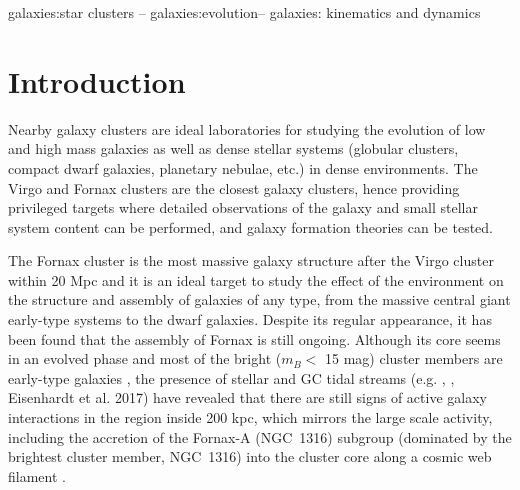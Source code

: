 \documentclass[useAMS,usenatbib]{mn2e}
\begin{document}
\begin{keywords}
galaxies:star clusters -- galaxies:evolution-- galaxies: kinematics and dynamics
\end{keywords}

\section{Introduction}

Nearby galaxy clusters are ideal laboratories for studying the evolution of 
low and high mass galaxies as well as dense stellar systems (globular 
clusters, compact dwarf galaxies, planetary nebulae, etc.) in dense environments. 
The Virgo and Fornax clusters are the closest galaxy clusters, hence providing 
privileged targets where detailed observations of the galaxy and small stellar 
system content can be performed, and galaxy formation theories can be tested. 

The Fornax cluster is the most massive galaxy structure after the Virgo cluster 
within 20 Mpc and it is an ideal target to study the effect of the environment 
on the structure and assembly of galaxies of any type, from the massive central 
giant early-type systems to the dwarf galaxies. Despite its regular appearance, 
it has been found that the assembly of Fornax is still ongoing. 
Although its core seems in an evolved phase \citep{Grillmair94,Jordan07} 
and most of the bright ($m_B < $  15 mag) cluster members are 
early-type galaxies \citep{Ferguson89}, the presence of stellar and GC tidal 
streams (e.g. \citealt{Iodice16}, \citealt{DAbrusco16}, Eisenhardt et al. 
2017) have revealed that there are still signs of active galaxy interactions in 
the region inside 200 kpc, which mirrors the large scale activity, including 
the accretion of the Fornax-A (NGC~1316) subgroup (dominated by the brightest 
cluster member, NGC~1316) into the cluster core along a 
cosmic web filament \citep{Drinkwater00,Scharf05}.
\end{document}
